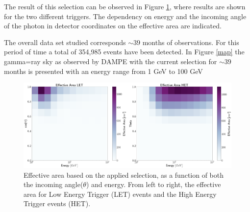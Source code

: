 \documentclass{PoS}
\begin{document}
The  result of this  selection can be observed in Figure \ref{eff_area}, where results are shown for the two different triggers. The dependency on energy and the incoming angle  of the photon in detector coordinates on the effective area are indicated.

The overall data set studied corresponds  $\sim 39$ months of observations. For  this period of time a total of  354,985 events have been detected. In Figure \ref{map} the gamma=ray sky as observed by DAMPE with the current selection for $\sim 39$ months is presented with an energy range from 1 GeV to 100 GeV









\begin{figure}
  \includegraphics[scale=0.65]{effective_Area.png}
  \caption{Effective area based on the applied selection, as a function of both the incoming angle($\theta$) and energy. From left to right, the effective area for Low Energy Trigger (LET) events and the High Energy Trigger events (HET). }
  \label{eff_area}
\end{figure}
\end{document}
